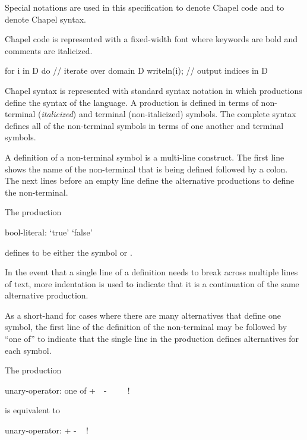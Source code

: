 \label{Notation}

Special notations are used in this specification to denote Chapel code
and to denote Chapel syntax.

Chapel code is represented with a fixed-width font where keywords are
bold and comments are italicized.
\begin{example}
\begin{chapel}
for i in D do   // iterate over domain D
  writeln(i);   // output indices in D
\end{chapel}
\end{example}

Chapel syntax is represented with standard syntax notation in which
productions define the syntax of the language.  A production is
defined in terms of non-terminal ({\it italicized}) and terminal
(non-italicized) symbols.  The complete syntax defines all of the
non-terminal symbols in terms of one another and terminal symbols.

A definition of a non-terminal symbol is a multi-line construct.  The
first line shows the name of the non-terminal that is being defined
followed by a colon.  The next lines before an empty line define the
alternative productions to define the non-terminal.
\begin{example}
The production
\begin{syntax_donotcollect}
bool-literal:
  `true'
  `false'
\end{syntax_donotcollect}
defines  to be either the symbol  or
.
\end{example}
In the event that a single line of a definition needs to break across
multiple lines of text, more indentation is used to indicate that it
is a continuation of the same alternative production.

As a short-hand for cases where there are many alternatives that
define one symbol, the first line of the definition of the
non-terminal may be followed by ``one of'' to indicate that the single
line in the production defines alternatives for each symbol.
\begin{example}
The production
\begin{syntax_donotcollect}
unary-operator: one of
  +\ \ -\ \ ~\ \ !
\end{syntax_donotcollect}
is equivalent to
\begin{syntax_donotcollect}
unary-operator:
  +
  -
  ~
  !
\end{syntax_donotcollect}
\end{example}

